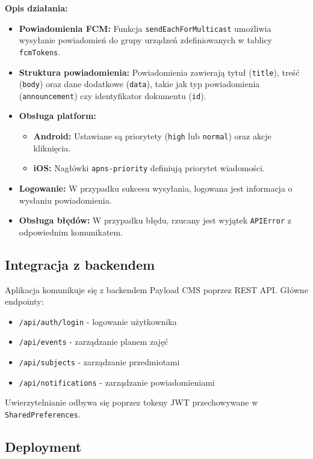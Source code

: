\textbf{Opis działania:}
\begin{itemize}
  \item \textbf{Powiadomienia FCM:} Funkcja \texttt{sendEachForMulticast} umożliwia wysyłanie powiadomień do grupy urządzeń zdefiniowanych w tablicy \texttt{fcmTokens}.
  \item \textbf{Struktura powiadomienia:} Powiadomienia zawierają tytuł (\texttt{title}), treść (\texttt{body}) oraz dane dodatkowe (\texttt{data}), takie jak typ powiadomienia (\texttt{announcement}) czy identyfikator dokumentu (\texttt{id}).
  \item \textbf{Obsługa platform:}
        \begin{itemize}
          \item \textbf{Android:} Ustawiane są priorytety (\texttt{high} lub \texttt{normal}) oraz akcje kliknięcia.
          \item \textbf{iOS:} Nagłówki \texttt{apns-priority} definiują priorytet wiadomości.
        \end{itemize}
  \item \textbf{Logowanie:} W przypadku sukcesu wysyłania, logowana jest informacja o wysłaniu powiadomienia.
  \item \textbf{Obsługa błędów:} W przypadku błędu, rzucany jest wyjątek \texttt{APIError} z odpowiednim komunikatem.
\end{itemize}

\subsection{Integracja z backendem}

Aplikacja komunikuje się z backendem Payload CMS poprzez REST API. Główne endpointy:

\begin{itemize}
  \item \texttt{/api/auth/login} - logowanie użytkownika
  \item \texttt{/api/events} - zarządzanie planem zajęć
  \item \texttt{/api/subjects} - zarządzanie przedmiotami
  \item \texttt{/api/notifications} - zarządzanie powiadomieniami
\end{itemize}
Uwierzytelnianie odbywa się poprzez tokeny JWT przechowywane w \texttt{SharedPreferences}.

\subsection{Deployment}

